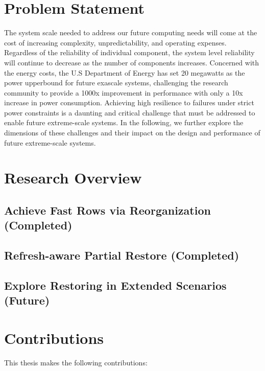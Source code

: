 \section{Problem Statement}

The system scale needed to address our future computing needs will come at the cost of increasing complexity, unpredictability, 
and operating expenses. 
Regardless of the reliability of individual component, the system level reliability will continue to decrease as the number of 
components increases. Concerned with the energy costs, the U.S Department of Energy has set 20 megawatts as the power upperbound 
for future exascale systems, challenging the research community to provide a 1000x improvement in performance with only a 
10x increase in power consumption. 
Achieving high resilience to failures under strict power constraints is a daunting and critical challenge that must be addressed 
to enable future extreme-scale systems. In the following, we further explore the dimensions of these challenges and their impact 
on the design and performance of future extreme-scale systems.

\section{Research Overview}

\subsection{Achieve Fast Rows via Reorganization (Completed)}

\subsection{Refresh-aware Partial Restore (Completed)}

\subsection{Explore Restoring in Extended Scenarios (Future)}


\section{Contributions}
This thesis makes the following contributions:

